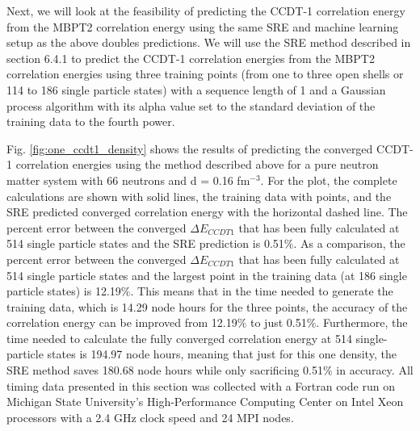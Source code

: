 Next, we will look at the feasibility of predicting the CCDT-1 correlation energy from the MBPT2 correlation energy using the same SRE and machine learning setup as the above doubles predictions. We will use the SRE method described in section 6.4.1 to predict the CCDT-1 correlation energies from the MBPT2 correlation energies using three training points (from one to three open shells or 114 to 186 single particle states) with a sequence length of 1 and a Gaussian process algorithm with its alpha value set to the standard deviation of the training data to the fourth power.

Fig. \ref{fig:one_ccdt1_density} shows the results of predicting the converged CCDT-1 correlation energies using the method described above for a pure neutron matter system with 66 neutrons and d = 0.16 fm$^{-3}$. For the plot, the complete calculations are shown with solid lines, the training data with points, and the SRE predicted converged correlation energy with the horizontal dashed line. The percent error between the converged $\Delta E_{CCDT1}$ that has been fully calculated at 514 single particle states and the SRE prediction is 0.51$\%$. As a comparison, the percent error between the converged $\Delta E_{CCDT1}$ that has been fully calculated at 514 single particle states and the largest point in the training data (at 186 single particle states) is 12.19$\%$. This means that in the time needed to generate the training data, which is 14.29 node hours for the three points, the accuracy of the correlation energy can be improved from 12.19$\%$ to just 0.51$\%$. Furthermore, the time needed to calculate the fully converged correlation energy at 514 single-particle states is 194.97 node hours, meaning that just for this one density, the SRE method saves 180.68 node hours while only sacrificing 0.51$\%$ in accuracy. All timing data presented in this section was collected with a Fortran code run on Michigan State University's High-Performance Computing Center on Intel Xeon processors with a 2.4 GHz clock speed and 24 MPI nodes.

